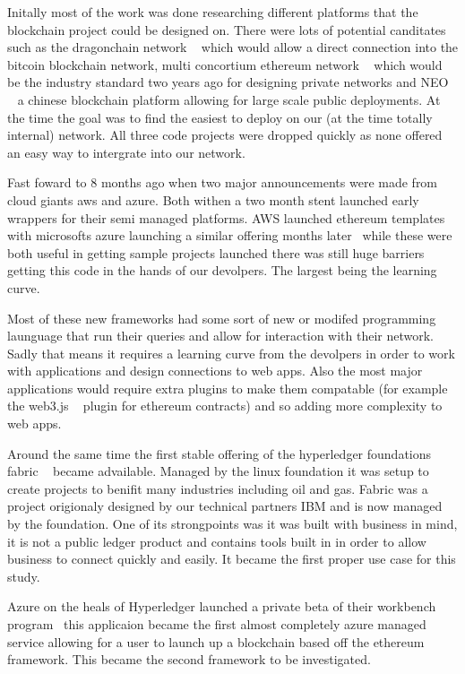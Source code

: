 \documentclass[runningheads]{llncs}
\begin{document}
Initally most of the work was done researching different platforms that the blockchain project could be designed on. There were lots of potential canditates such as the dragonchain network ~\cite{DragonChain} which would allow a direct connection into the bitcoin blockchain network, multi concortium ethereum network ~\cite{eth} which would be the industry standard two years ago for designing private networks and NEO ~\cite{neo} a chinese blockchain platform allowing for large scale public deployments. At the time the goal was to find the easiest to deploy on our (at the time totally internal) network. All three code projects were dropped quickly as none offered an easy way to intergrate into our network.

Fast foward to 8 months ago when two major announcements were made from cloud giants aws and azure. Both withen a two month stent launched early wrappers for their semi managed platforms. AWS launched ethereum templates ~\cite{aws} with microsofts azure launching a similar offering months later~\cite{azure} while these were both useful in getting sample projects launched there was still huge barriers getting this code in the hands of our devolpers. The largest being the learning curve.

Most of these new frameworks had some sort of new or modifed programming launguage that run their queries and allow for interaction with their network. Sadly that means it requires a learning curve from the devolpers in order to work with applications and design connections to web apps. Also the most major applications would require extra plugins to make them compatable (for example the web3.js ~\cite{web3} plugin for ethereum contracts) and so adding more complexity to web apps.

Around the same time the first stable offering of the hyperledger foundations fabric ~\cite{hyper} became advailable. Managed by the linux foundation it was setup to create projects to benifit many industries including oil and gas. Fabric was a project origionaly designed by our technical partners IBM and is now managed by the foundation. One of its strongpoints was it was built with business in mind, it is not a public ledger product and contains tools built in in order to allow business to connect quickly and easily. It became the first proper use case for this study.

Azure on the heals of Hyperledger launched a private beta of their workbench program~\cite{bench} this applicaion became the first almost completely azure managed service allowing for a user to launch up a blockchain based off the ethereum framework. This became the second framework to be investigated. 
\end{document}
